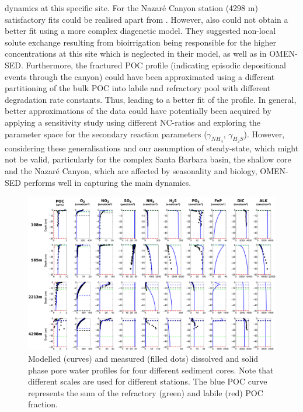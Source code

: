 \documentclass[gmd, manuscript]{copernicus}
\begin{document}
dynamics at this specific site. 
For the Nazar\'e Canyon station (4298 m) satisfactory fits could be realised apart from . However, also \citet{epping_oxidation_2002} could not obtain a better fit 
using a more complex diagenetic model. They suggested non-local solute exchange resulting from bioirrigation being responsible for the higher  concentrations at this site which is neglected in their model, as well as in 
OMEN-SED. Furthermore, the fractured POC profile (indicating episodic depositional events through the canyon) could have been approximated using a different partitioning of the bulk POC into 
labile and refractory pool with different degradation rate constants. Thus, leading to a better fit of the  profile.  
In general, better approximations of the data could have potentially been acquired by applying a sensitivity study using different NC-ratios \citep[e.g.][report different ratios from Redfield stoichiometry]{epping_oxidation_2002} 
and exploring the parameter space for the secondary reaction parameters ($\gamma_{NH_4}$, $\gamma_{H_2S}$). 
However, considering these generalisations and our assumption of steady-state, which might not be valid, particularly for the complex Santa Barbara basin, the shallow core and the Nazar\'e Canyon, which are affected by seasonality 
and biology, OMEN-SED performs well in capturing the main dynamics. 

\begin{figure}
	\includegraphics[width=1.0\textwidth]{figures/Profiles/0_ALL_PROFILES_COMBINED_1503.pdf}
	\caption{Modelled (curves) and measured (filled dots) dissolved and solid phase pore water profiles for four different sediment cores. Note that different 
	scales are used for different stations. The blue POC curve represents the sum of the refractory (green) and labile (red) POC fraction.}
	\label{fig:Sediment_profiles}
\end{figure}
\end{document}
